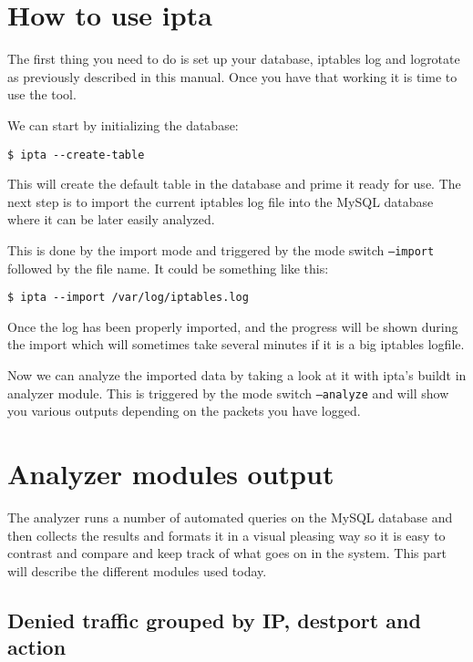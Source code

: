\documentclass[english,twoside,openright,a4paper,12pt]{article}
\begin{document}
\section{How to use ipta}

The first thing you need to do is set up your database, iptables log
and logrotate as previously described in this manual. Once you have
that working it is time to use the tool.

We can start by initializing the database:

\begin{verbatim}
$ ipta --create-table
\end{verbatim}

This will create the default table in the database and prime it ready
for use. The next step is to import the current iptables log file into
the MySQL database where it can be later easily analyzed.

This is done by the import mode and triggered by the mode switch
\texttt{--import} followed by the file name. It could be something like this:

\begin{verbatim}
$ ipta --import /var/log/iptables.log
\end{verbatim}

Once the log has been properly imported, and the progress will be
shown during the import which will sometimes take several minutes if
it is a big iptables logfile.

Now we can analyze the imported data by taking a look at it with
ipta's buildt in analyzer module. This is triggered by the mode switch
\texttt{--analyze} and will show you various outputs depending on the
packets you have logged.

\section{Analyzer modules output}

The analyzer runs a number of automated queries on the MySQL database
and then collects the results and formats it in a visual pleasing way
so it is easy to contrast and compare and keep track of what goes on
in the system. This part will describe the different modules used
today.

\subsection{Denied traffic grouped by IP, destport and action}
\end{document}
